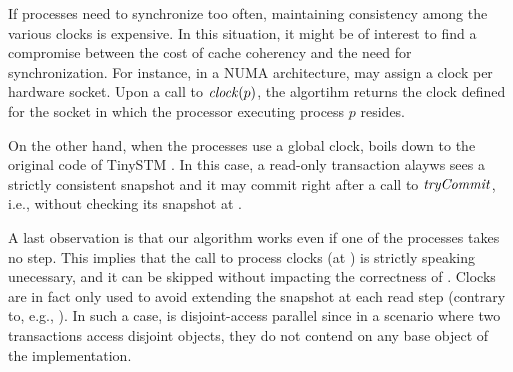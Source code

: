 If processes need to synchronize too often, maintaining consistency among the various clocks is expensive.
In this situation, it might be of interest to find a compromise between the cost of cache coherency and the need for synchronization.
For instance, in a NUMA architecture,  may assign a clock per hardware socket.
Upon a call to $\clockOf{p}$, the algortihm returns the clock defined for the socket in which the processor executing process $p$ resides.

On the other hand, when the processes use a global clock,  boils down to the original code of TinySTM \cite{}.
In this case, a read-only transaction alayws sees a strictly consistent snapshot and it may commit right after a call to $\stmTryCommitFunction$, i.e., without checking its snapshot at .

A last observation is that our algorithm works even if one of the processes takes no step.
This implies that the call to process clocks (at ) is strictly speaking unecessary, and it can be skipped without impacting the correctness of .
Clocks are in fact only used to avoid extending the snapshot at each read step (contrary to, e.g., \cite{}).
In such a case,  is disjoint-access parallel since in a scenario where two transactions access disjoint objects, they do not contend on any base object of the implementation.
